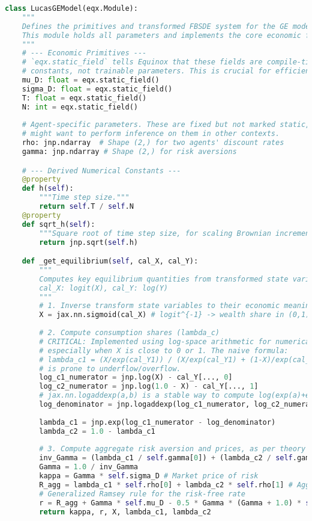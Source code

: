 \documentclass[11pt,letterpaper,oneside]{article}
\theoremstyle{plain}
\theoremstyle{definition}
\theoremstyle{remark}
\begin{document}
\begin{lstlisting}[language=Python, caption={C.2: Transformed Lucas Model FBSDE Coefficients in JAX.}, label={lst:lucas_jax_transformed_app_appendix}]
class LucasGEModel(eqx.Module):
    """
    Defines the primitives and transformed FBSDE system for the GE model.
    This module holds all parameters and implements the core economic functions.
    """
    # --- Economic Primitives ---
    # `eqx.static_field` tells Equinox that these fields are compile-time 
    # constants, not trainable parameters. This is crucial for efficient JIT compilation.
    mu_D: float = eqx.static_field()
    sigma_D: float = eqx.static_field()
    T: float = eqx.static_field()
    N: int = eqx.static_field()
    
    # Agent-specific parameters. These are fixed but not marked static, as one
    # might want to perform inference on them in other contexts.
    rho: jnp.ndarray  # Shape (2,) for two agents' discount rates
    gamma: jnp.ndarray # Shape (2,) for risk aversions

    # --- Derived Numerical Constants ---
    @property
    def h(self): 
        """Time step size."""
        return self.T / self.N
    @property
    def sqrt_h(self): 
        """Square root of time step size, for scaling Brownian increments."""
        return jnp.sqrt(self.h)

    def _get_equilibrium(self, cal_X, cal_Y):
        """
        Computes key equilibrium quantities from transformed state variables.
        cal_X: logit(X), cal_Y: log(Y)
        """
        # 1. Inverse transform state variables to their economic meaning
        X = jax.nn.sigmoid(cal_X) # logit^{-1} -> wealth share in (0,1)
        
        # 2. Compute consumption shares (lambda_c)
        # CRITICAL: Implemented using log-space arithmetic for numerical stability,
        # especially when X is close to 0 or 1. The naive formula:
        # lambda_c1 = (X/exp(cal_Y1)) / (X/exp(cal_Y1) + (1-X)/exp(cal_Y2))
        # is prone to underflow/overflow.
        log_c1_numerator = jnp.log(X) - cal_Y[..., 0]
        log_c2_numerator = jnp.log(1.0 - X) - cal_Y[..., 1]
        # jax.nn.logaddexp(a,b) is a stable way to compute log(exp(a)+exp(b))
        log_denominator = jnp.logaddexp(log_c1_numerator, log_c2_numerator)
        
        lambda_c1 = jnp.exp(log_c1_numerator - log_denominator)
        lambda_c2 = 1.0 - lambda_c1
        
        # 3. Compute aggregate risk aversion and prices, as per theory
        inv_Gamma = (lambda_c1 / self.gamma[0]) + (lambda_c2 / self.gamma[1])
        Gamma = 1.0 / inv_Gamma
        kappa = Gamma * self.sigma_D # Market price of risk
        R_agg = lambda_c1 * self.rho[0] + lambda_c2 * self.rho[1] # Agg. discount rate
        # Generalized Ramsey rule for the risk-free rate
        r = R_agg + Gamma * self.mu_D - 0.5 * Gamma * (Gamma + 1.0) * self.sigma_D**2
        return kappa, r, X, lambda_c1, lambda_c2


\end{lstlisting}
\end{document}
